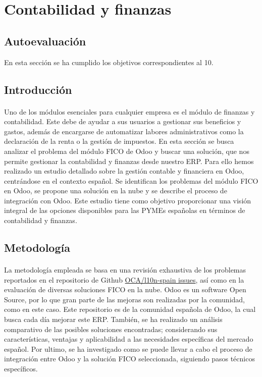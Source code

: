 \section{Contabilidad y finanzas}
\subsection{Autoevaluación}
En esta sección se ha cumplido los objetivos correspondientes al 10.
\subsection{Introducción}
\paragraph{}
Uno de los módulos esenciales para cualquier empresa es el módulo de finanzas y contabilidad. Este debe de ayudar a sus usuarios a gestionar sus beneficios y gastos, además de encargarse de automatizar labores administrativos como la declaración de la renta o la gestión de impuestos. En esta sección se busca analizar el problema del módulo FICO de Odoo y buscar una solución, que nos permite gestionar la contabilidad y finanzas desde nuestro ERP. Para ello hemos realizado un estudio detallado sobre la gestión contable y financiera en Odoo, centrándose en el contexto español. Se identifican los problemas del módulo FICO en Odoo, se propone una solución en la nube y se describe el proceso de integración con Odoo. Este estudio tiene como objetivo proporcionar una visión integral de las opciones disponibles para las PYMEs españolas en términos de contabilidad y finanzas.
\subsection{Metodología}
\paragraph{}
La metodología empleada se basa en una revisión exhaustiva de los problemas reportados en el repositorio de Github \href{https://github.com/OCA/l10n-spain/issues}{OCA/l10n-spain issues}, así como en la evaluación de diversas soluciones FICO en la nube. Odoo es un software Open Source, por lo que gran parte de las mejoras son realizadas por la comunidad, como en este caso. Este repositorio es de la comunidad española de Odoo, la cual busca cada día mejorar este ERP. También, se ha realizado un análisis comparativo de las posibles soluciones encontradas; considerando sus características, ventajas y aplicabilidad a las necesidades específicas del mercado español. Por ultimo, se ha investigado como se puede llevar a cabo el proceso de integración entre Odoo y la solución FICO seleccionada, siguiendo pasos técnicos específicos.
